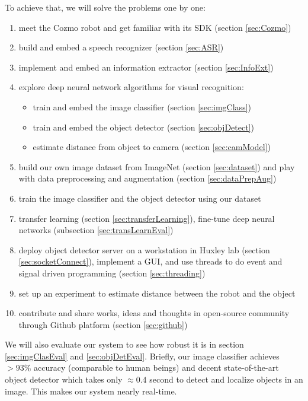To achieve that, we will solve the problems one by one: 
\begin{enumerate}
	\item meet the Cozmo robot and get familiar with its SDK (section \ref{sec:Cozmo})
	\item build and embed a speech recognizer (section \ref{sec:ASR})
	\item implement and embed an information extractor (section \ref{sec:InfoExt})
	\item explore deep neural network algorithms for visual recognition: 
	\begin{itemize}
		\item train and embed the image classifier (section \ref{sec:imgClass})
		\item train and embed the object detector (section \ref{sec:objDetect})
		\item estimate distance from object to camera (section \ref{sec:camModel})
	\end{itemize}
	\item build our own image dataset from ImageNet (section \ref{sec:dataset}) and play with data preprocessing and augmentation (section \ref{sec:dataPrepAug})
	\item train the image classifier and the object detector using our dataset
	\item transfer learning (section \ref{sec:transferLearning}), fine-tune deep neural networks (subsection \ref{sec:transLearnEval})
	\item deploy object detector server on a workstation in Huxley lab (section \ref{sec:socketConnect}), implement a GUI, and use threads to do event and signal driven programming (section \ref{sec:threading})
	\item set up an experiment to estimate distance between the robot and the object
	\item contribute and share works, ideas and thoughts in open-source community through Github platform (section \ref{sec:github})	
\end{enumerate} 

We will also evaluate our system to see how robust it is in section \ref{sec:imgClasEval} and \ref{sec:objDetEval}. Briefly, our image classifier achieves $> 93\%$ accuracy (comparable to human beings) and decent state-of-the-art object detector which takes only $\approx 0.4$ second to detect and localize objects in an image. This makes our system nearly real-time.


%
%
